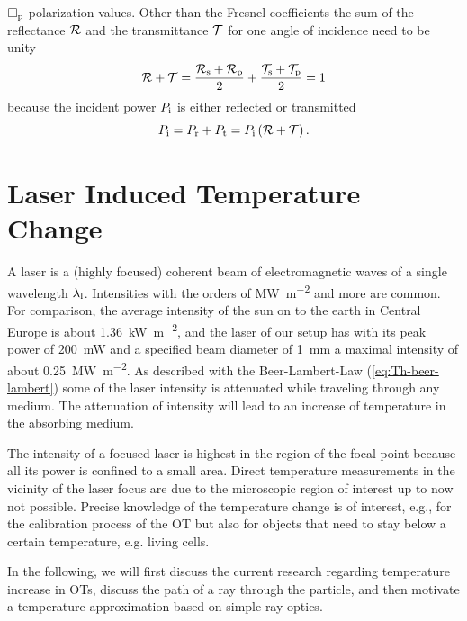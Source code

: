 $\Box_{\mathrm{p}}$ polarization values. Other than the Fresnel coefficients the 
sum of the reflectance $\mathcal{R}$ and the transmittance $\mathcal{T}$ for one 
angle of incidence need to be unity
\begin{equation}
  \mathcal{R} + \mathcal{T} = 
  \frac{\mathcal{R}_{\mathrm{s}}+\mathcal{R}_{\mathrm{p}}}{2} +
  \frac{\mathcal{T}_{\mathrm{s}}+\mathcal{T}_{\mathrm{p}}}{2} = 1 
  \label{eq:Th-fresnel}
\end{equation}
because the incident power $P_{\mathrm{i}}$ is either reflected or transmitted
\begin{equation}
  P_{\mathrm{i}} = P_{\mathrm{r}} + P_{\mathrm{t}} = P_{\mathrm{i}}\left( \mathcal{R} + \mathcal{T} 
  \right).
\end{equation}

\section{Laser Induced Temperature Change\label{sec:Th-temperature}}

A laser is a (highly focused) coherent beam of electromagnetic waves of a 
single wavelength $\lambda_{\mathrm{l}}$. Intensities with the orders of 
\si{\mega\watt\per\square\meter} and more are common. For comparison, the 
average intensity of the sun on to the earth in Central Europe is about 
\SI{1.36}{\kilo\watt\per\square\meter}, and the laser of our setup has with its 
peak power of \SI{200}{\milli\watt} and a specified beam diameter of 
\SI{1}{\mm} a maximal intensity of about 
\SI{0.25}{\mega\watt\per\square\meter}. As described with the Beer-Lambert-Law
(\cref{eq:Th-beer-lambert}) some of the laser intensity is attenuated while 
traveling through any medium. The attenuation of intensity will lead to an 
increase of temperature in the absorbing medium.

The intensity of a focused laser is highest in the region of the focal point 
because all its power is confined to a small area. Direct temperature 
measurements in the vicinity of the laser focus are due to the microscopic 
region of interest up to now not possible. Precise knowledge of the temperature 
change is of interest, e.g., for the calibration process of the OT but also for 
objects that need to stay below a certain temperature, e.g. living cells.

In the following, we will first discuss the current research regarding 
temperature increase in OTs, discuss the path of a ray through the particle, 
and then motivate a temperature approximation based on simple ray optics.

